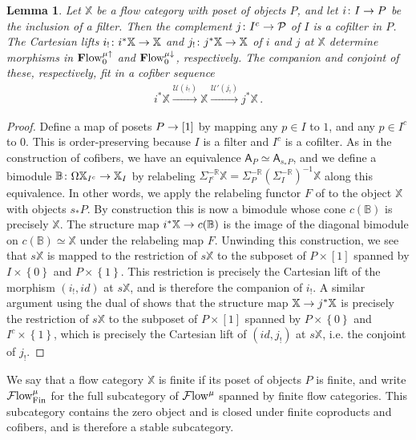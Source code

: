 \documentclass[10pt]{amsart}
\numberwithin{equation}{section}
\newtheorem{lem}[prop]{Lemma}
\theoremstyle{definition}
\DeclareMathOperator{\Fin}{Fin}
\newcommand{\Flow}{\cF\mathrm{low}\vphantom{w}}
\newcommand{\bfPreFlow}{\mathbf{F}\mathrm{low}\vphantom{w}}
\newcommand{\bB}{\mathbb{B}}
\newcommand{\bR}{\mathbb{R}}
\newcommand{\bX}{\mathbb{X}}
\newcommand{\cP}{\mathcal{P}}
\newcommand{\cF}{\mathcal{F}}
\newcommand{\cU}{\mathcal{U}}
\newcommand{\sfA}{\mathsf{A}}
\renewcommand{\to}{\mathchoice{\longrightarrow}{\rightarrow}{}{}}
\begin{document}
\begin{lem}\label{lem:cofiber_of_a_filter}
	Let $\bX$ be a flow category with poset of objects $P$, and let $i \colon I\to P$ be the inclusion of a filter.
  Then the complement $j\colon I^{c} \to \cP$ of $I$ is a cofilter in $P$.
  The Cartesian lifts $i_{!}\colon i^{*}\bX \to \bX$ and $j_{!}\colon j^{*}\bX \to \bX$ of $i$ and $j$ at $\bX$ determine morphisms in $\bfPreFlow^{\mu\uparrow}_{0}$ and $\bfPreFlow^{\mu\downarrow}_{0}$, respectively.
  The companion and conjoint of these, respectively, fit in a cofiber sequence
	\begin{align*}
		i^{*}\bX \xrightarrow{\cU(i_{!})} \bX \xrightarrow{\cU'(j_{!})} j^{*}\bX \,.
	\end{align*}
\end{lem}
\begin{proof}
	Define a map of posets $P\to [1]$ by mapping any $p\in I$ to $1$, and any $p\in I^{c}$ to $0$. This is order-preserving because $I$ is a filter and $I^{c}$ is a cofilter.
  As in the construction of cofibers, we have an equivalence $\sfA_{P} \simeq \sfA_{s_{*}P}$, and we define a bimodule $\bB\colon \Omega \bX_{I^{c}} \to \bX_{I}$ by relabeling $\Sigma^{-\bR}_{I^{c}}\bX = \Sigma^{-\bR}_{P}(\Sigma_{I}^{-\bR})^{-1}\bX $ along this equivalence.
  In other words, we apply the relabeling functor $F$ of  to the object $\bX$ with objects $s_{*}P$.
  By construction this is now a bimodule whose cone $c(\bB)$ is precisely $\bX$.
  The structure map $i^{*}\bX \to c(\bB)$ is the image of the diagonal bimodule on $c(\bB) \simeq \bX$ under the relabeling map $F$.
  Unwinding this construction, we see that $s\bX$ is mapped to the restriction of $s\bX$ to the subposet of $P\times [1]$ spanned by $I\times \left\{ 0\right\}$ and $P\times \left\{ 1\right\}$.
  This restriction is precisely the Cartesian lift of the morphism $(i_{!},id)$ at $s\bX$, and is therefore the companion of $i_{!}$.
  A similar argument using the dual of  shows that the structure map $\bX \to j^{*}\bX$ is precisely the restriction of $s\bX$ to the subposet of $P\times [1]$ spanned by $P\times \left\{ 0\right\}$ and $I^{c} \times \left\{ 1\right\}$, which is precisely the Cartesian lift of $(id, j_{!})$ at $s\bX$, i.e. the conjoint of $j_{!}$.
\end{proof}



We say that a flow category $\bX$ is finite if its poset of objects $P$ is finite, and write $\Flow^{\mu}_{\Fin}$ for the full subcategory of $\Flow^{\mu}$ spanned by finite flow categories.
This subcategory contains the zero object and is closed under finite coproducts and cofibers, and is therefore a stable subcategory.
\end{document}
